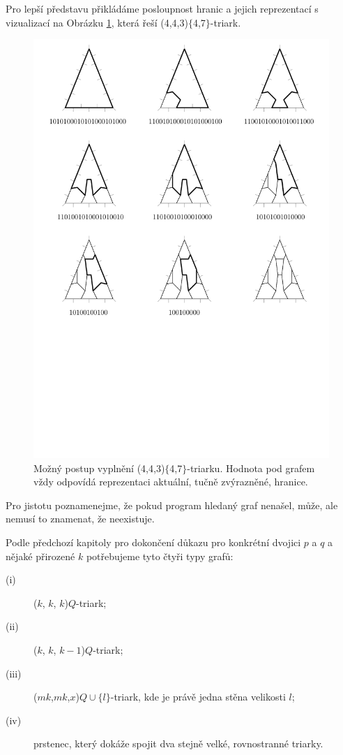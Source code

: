 Pro lepší představu přikládáme posloupnost hranic a jejich reprezentací s vizualizací na Obrázku \ref{obr03:reseni}, která řeší (4,4,3)$\lbrace$4,7$\rbrace$-triark. 

\begin{figure}[h!]\centering
\includegraphics[width=\textwidth]{../img/reseni}
\caption{Možný postup vyplnění (4,4,3)$\lbrace$4,7$\rbrace$-triarku. Hodnota pod grafem vždy odpovídá reprezentaci aktuální, tučně zvýrazněné, hranice.}
\label{obr03:reseni}
\end{figure}

Pro jistotu poznamenejme, že pokud program hledaný graf nenašel, může, ale nemusí to znamenat, že neexistuje.

Podle předchozí kapitoly pro dokončení důkazu pro konkrétní dvojici $p$ a $q$ a nějaké přirozené $k$ potřebujeme tyto čtyři typy grafů:
\begin{description}
\item[(i)] ($k$, $k$, $k$)$Q$-triark;
\item[(ii)] ($k$, $k$, $k-1$)$Q$-triark;
\item[(iii)] ($mk$,$mk$,$x$)$Q\cup \lbrace l\rbrace$-triark, kde je právě jedna stěna velikosti $l$;
\item[(iv)] prstenec, který dokáže spojit dva stejně velké, rovnostranné triarky.
\end{description}

